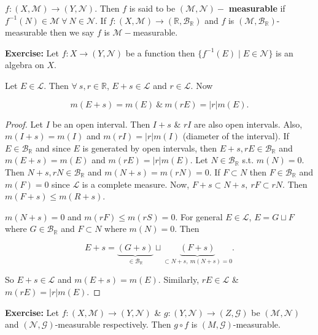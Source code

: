 \documentclass{functionspaces}
\begin{document}
\begin{definition}[Measurable]
$f:(X,\mathcal{M}) \to (Y,\mathcal{N})$. Then $f$ is said to be $(\mathcal{M},\mathcal{N})-$ \textbf{measurable} if $f^{-1}(N) \in \mathcal{M}\ \forall\ N \in \mathcal{N}$. If $f:(X,\mathcal{M}) \to (\mathbb{R},\mathcal{B}_{\mathbb{R}})$ and $f$ is $(\mathcal{M},\mathcal{B}_{\mathbb{R}})$-measurable then we say $f$ is $\mathcal{M}-$measurable.
\end{definition}

\noindent\textbf{Exercise:} Let $f:X \to (Y,\mathcal{N})$ be a function then $\{f^{-1}(E) \mid E \in \mathcal{N}\}$ is an algebra on $X$.

\begin{theorem}
Let $E \in \mathcal{L}$. Then $\forall\ s,r \in \mathbb{R}$, $E+s \in \mathcal{L}$ and $r \in \mathcal{L}$. Now

\[
m(E+s) = m(E)\ \&\ m(rE) = |r| m(E).
\]
\end{theorem}

\begin{proof}
Let $I$ be an open interval. Then $I+s$ \& $rI$ are also open intervals. Also, $m(I+s) = m(I)$ and $m(rI) = |r| m(I)$ (diameter of the interval). If $E \in \mathcal{B}_{\mathbb{R}}$ and since $E$ is generated by open intervals, then $E+s, rE \in \mathcal{B}_{\mathbb{R}}$ and $m(E+s) = m(E)$ and $m(rE) = |r| m(E)$. Let $N \in \mathcal{B}_{\mathbb{R}}$ s.t. $m(N) = 0$. Then $N+s, rN \in \mathcal{B}_{\mathbb{R}}$ and $m(N+s) = m(rN) = 0$. If $F \subset N$ then $F \in \mathcal{B}_{\mathbb{R}}$ and $m(F) = 0$ since $\mathcal{L}$ is a complete measure. Now, $F+s \subset N+s,\ rF \subset rN$. Then $m(F+s) \leq m(R+s)$.

$m(N+s) = 0$ and $m(rF) \leq m(rS) = 0$. For general $E \in \mathcal{L}$, $E = G \sqcup F$ where $G \in \mathcal{B}_{\mathbb{R}}$ and $F \subset N$ where $m(N) = 0$. Then

\[
E+s = \underbrace{(G+s)}_{\in \mathcal{B}_{\mathbb{R}}} \sqcup \underbrace{(F+s)}_{\subset N+s,\ m(N+s) = 0}.
\]

So $E+s \in \mathcal{L}$ and $m(E+s) = m(E)$. Similarly, $rE \in \mathcal{L}$ \& $m(rE) = |r| m(E)$.
\end{proof}

\noindent\textbf{Exercise:} Let $f:(X,\mathcal{M}) \to (Y,\mathcal{N})$ \& $g:(Y,\mathcal{N}) \to (Z,\mathcal{G})$ be $(\mathcal{M},\mathcal{N})$ and $(\mathcal{N},\mathcal{G})$-measurable respectively. Then $g \circ f$ is $(M,\mathcal{G})$-measurable.
\end{document}
